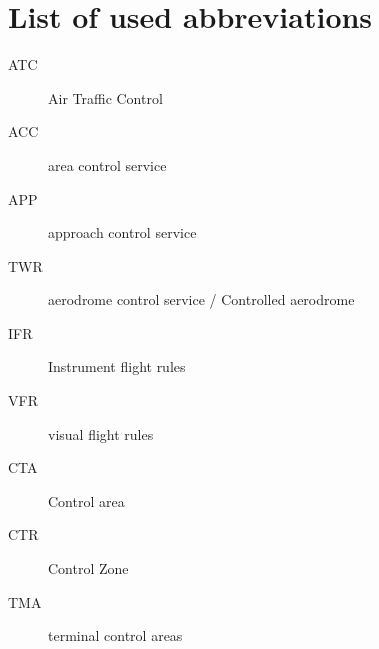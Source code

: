 \chapter{List of used abbreviations}

\begin{description}
\item[ATC] Air Traffic Control
\item[ACC] area control service
\item[APP] approach control service
\item[TWR] aerodrome control service / Controlled aerodrome
\item[IFR] Instrument flight rules
\item[VFR] visual flight rules
\item[CTA] Control area
\item[CTR] Control Zone
\item[TMA] terminal control areas
\end{description}